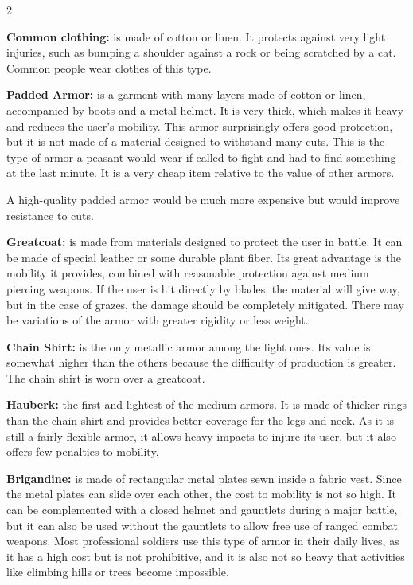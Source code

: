 \begin{multicols}{2}


\textbf{Common clothing:} is made of cotton or linen. It protects against very light injuries, such as bumping a shoulder against a rock or being scratched by a cat. Common people wear clothes of this type.

\textbf{Padded Armor:} is a garment with many layers made of cotton or linen, accompanied by boots and a metal helmet. It is very thick, which makes it heavy and reduces the user's mobility. This armor surprisingly offers good protection, but it is not made of a material designed to withstand many cuts. This is the type of armor a peasant would wear if called to fight and had to find something at the last minute. It is a very cheap item relative to the value of other armors.

A high-quality padded armor would be much more expensive but would improve resistance to cuts.

\textbf{Greatcoat:} is made from materials designed to protect the user in battle. It can be made of special leather or some durable plant fiber. Its great advantage is the mobility it provides, combined with reasonable protection against medium piercing weapons. If the user is hit directly by blades, the material will give way, but in the case of grazes, the damage should be completely mitigated. There may be variations of the armor with greater rigidity or less weight.

\textbf{Chain Shirt: } is the only metallic armor among the light ones. Its value is somewhat higher than the others because the difficulty of production is greater. The chain shirt is worn over a greatcoat.

\textbf{Hauberk:} the first and lightest of the medium armors. It is made of thicker rings than the chain shirt and provides better coverage for the legs and neck. As it is still a fairly flexible armor, it allows heavy impacts to injure its user, but it also offers few penalties to mobility.

\textbf{Brigandine:} is made of rectangular metal plates sewn inside a fabric vest. Since the metal plates can slide over each other, the cost to mobility is not so high. It can be complemented with a closed helmet and gauntlets during a major battle, but it can also be used without the gauntlets to allow free use of ranged combat weapons. Most professional soldiers use this type of armor in their daily lives, as it has a high cost but is not prohibitive, and it is also not so heavy that activities like climbing hills or trees become impossible.


\end{multicols}
